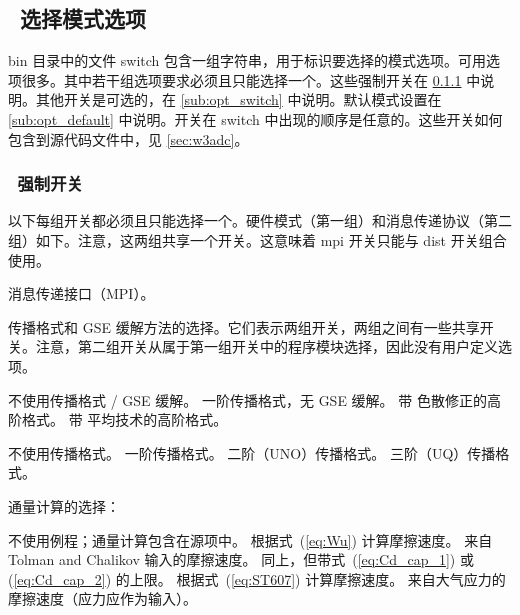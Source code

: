 \vssub
\subsection{~选择模式选项} \label{sec:switches}
\vssub

{\file bin} 目录中的文件 {\file switch} 包含一组字符串，用于标识要选择的模式选项。可用选项很多。其中若干组选项要求必须且只能选择一个。这些强制开关在 \para\ref{sub:man_switch} 中说明。其他开关是可选的，在 \para\ref{sub:opt_switch} 中说明。默认模式设置在 \para\ref{sub:opt_default} 中说明。开关在 {\file switch} 中出现的顺序是任意的。这些开关如何包含到源代码文件中，见 \para\ref{sec:w3adc}。

\vsssub
\subsubsection{~强制开关} \label{sub:man_switch}
\vsssub

以下每组开关都必须且只能选择一个。硬件模式（第一组）和消息传递协议（第二组）如下。注意，这两组共享一个开关。这意味着 {\sc mpi} 开关只能与 {\sc dist} 开关组合使用。
\begin{slist}
\end{slist}

\begin{slist}
 {消息传递接口（MPI）。}
\end{slist}

\noindent
传播格式和 GSE 缓解方法的选择。它们表示两组开关，两组之间有一些共享开关。注意，第二组开关从属于第一组开关中的程序模块选择，因此没有用户定义选项。
\begin{slist}
 {不使用传播格式 / GSE 缓解。}
 {一阶传播格式，无 GSE 缓解。}
 {带 \cite{art:BH87} 色散修正的高阶格式。}
 {带 \cite{tol:OMOD02b} 平均技术的高阶格式。}
\end{slist}

\begin{slist}
 {不使用传播格式。}
 {一阶传播格式。}
 {二阶（UNO）传播格式。}
 {三阶（UQ）传播格式。}
\end{slist}

\noindent
通量计算的选择：
\begin{slist}
 {不使用例程；通量计算包含在源项中。}
 {根据式~(\ref{eq:Wu}) 计算摩擦速度。}
 {来自 Tolman and Chalikov 输入的摩擦速度。}
 {同上，但带式~(\ref{eq:Cd_cap_1}) 或 (\ref{eq:Cd_cap_2}) 的上限。}
 {根据式~(\ref{eq:ST607}) 计算摩擦速度。}
 {来自大气应力的摩擦速度（应力应作为输入）。}
\end{slist}


